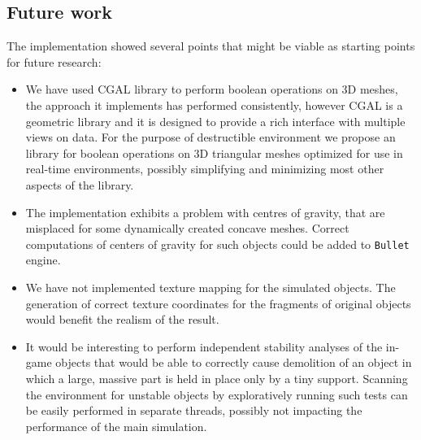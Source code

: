 \subsection*{Future work}
The implementation showed several points that might be viable as starting points for future research:
\begin{itemize}

\item We have used CGAL library to perform boolean operations on 3D meshes, the approach it implements has performed consistently, however CGAL is a geometric library and it is designed to provide a rich interface with multiple views on data. For the purpose of destructible environment we propose an library for boolean operations on 3D triangular meshes optimized for use in real-time environments, possibly simplifying and minimizing most other aspects of the library.

\item The implementation exhibits a problem with centres of gravity, that are misplaced for some dynamically created concave meshes. Correct computations of centers of gravity for such objects could be added to \texttt{Bullet} engine.

\item We have not implemented texture mapping for the simulated objects. The generation of correct texture coordinates for the fragments of original objects would benefit the realism of the result.

\item It would be interesting to perform independent stability analyses of the in-game objects that would be able to \eg correctly cause demolition of an object in which a large, massive part is held in place only by a tiny support. Scanning the environment for unstable objects by exploratively running such tests can be easily performed in separate threads, \ie possibly not impacting the performance of the main simulation.


\end{itemize}


